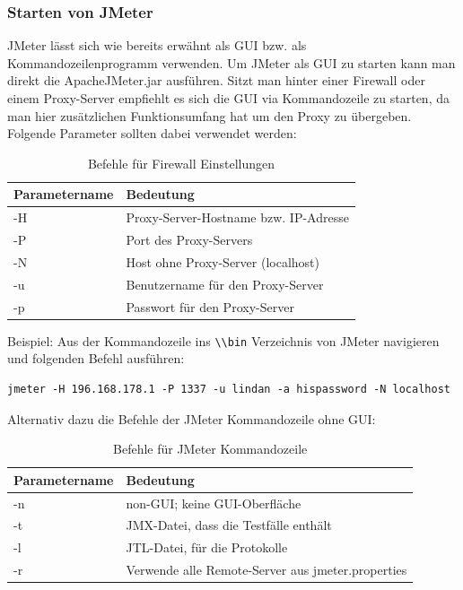 \documentclass[a4paper,12pt]{article}
\newcommand{\codeInLine}[1]{%
\colorbox{graybackgroundColor}{\lstinline{#1}} %
}
\begin{document}
\subsubsection{Starten von JMeter}
JMeter lässt sich wie bereits erwähnt als GUI bzw. als Kommandozeilenprogramm verwenden.  Um JMeter als GUI zu starten kann man direkt die ApacheJMeter.jar ausführen. Sitzt man hinter einer Firewall oder einem Proxy-Server empfiehlt es sich die GUI via Kommandozeile zu starten, da man hier zusätzlichen Funktionsumfang hat um den Proxy zu übergeben. Folgende Parameter sollten dabei verwendet werden:

\begin{table}[H]
	\centering
	\begin{tabular}{|l|l|}
		\hline
		\textbf{Parametername} & \textbf{Bedeutung} \\
		\hline
		-H & Proxy-Server-Hostname bzw. IP-Adresse \\
		-P & Port des Proxy-Servers \\
		-N & Host ohne Proxy-Server (localhost) \\ 
		-u & Benutzername für den Proxy-Server \\
		-p & Passwort für den Proxy-Server \\
		\hline
	\end{tabular}
	\caption[tab_parameter_gui]{Befehle für Firewall Einstellungen}
	\label{tab_parameter_gui}
\end{table}

Beispiel: Aus der Kommandozeile ins \codeInLine{\\bin} Verzeichnis von JMeter navigieren und folgenden Befehl ausführen: 
\begin{lstlisting}
jmeter -H 196.168.178.1 -P 1337 -u lindan -a hispassword -N localhost
\end{lstlisting}
Alternativ dazu die Befehle der JMeter Kommandozeile ohne GUI:

\begin{table}[H]
	\centering
	\begin{tabular}{|l|l|}
		\hline
		\textbf{Parametername} & \textbf{Bedeutung} \\
		\hline
		-n & non-GUI; keine GUI-Oberfläche \\
		-t & JMX-Datei, dass die Testfälle enthält \\
		-l & JTL-Datei, für die Protokolle \\ 
		-r & Verwende alle Remote-Server aus jmeter.properties \\
		\hline
	\end{tabular}
	\caption[tab_parameter_non_gui]{Befehle für JMeter Kommandozeile}
	\label{tab_parameter_non_gui}
\end{table}
\end{document}
